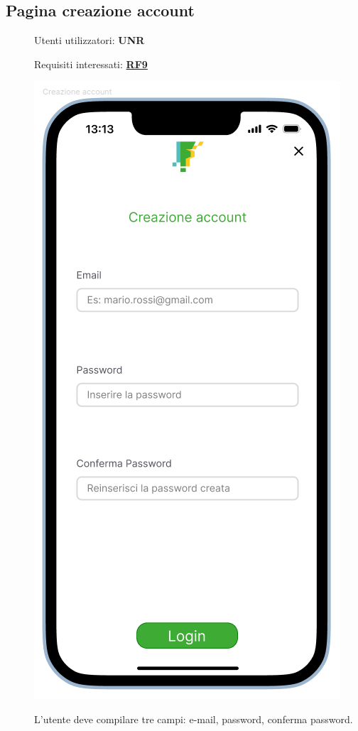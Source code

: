 \documentclass{article}
\begin{document}
\subsection{Pagina creazione account}
\begin{description}
    \item[] Utenti utilizzatori: \textbf{UNR}
    \item[] Requisiti interessati: \hyperref[rf_9]{\textbf{RF9}}
    \item[] \begin{center}
            \includegraphics[scale=0.6]{Crea_Account.png}
        \end{center}
    \item[] L'utente deve compilare tre campi: e-mail, password, conferma password.
\end{description}
\clearpage
\end{document}

